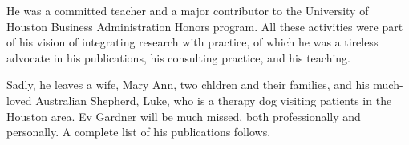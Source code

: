 \documentclass[11pt, a4paper]{article}
\begin{document}
He was a committed teacher and a major contributor to the University of Houston Business Administration Honors program. All these activities were part of his vision of integrating research with practice, of which he was a tireless advocate in his publications, his consulting practice, and his teaching.

Sadly, he leaves a wife, Mary Ann, two chldren and their families, and his much-loved Australian Shepherd, Luke, who is a therapy dog visiting patients in the Houston area. Ev Gardner will be much missed, both professionally and personally. A complete list of his publications follows.


\nocite{*}
\printbibliography[heading=subbibliography, title = {PhD}, type=thesis]
\printbibliography[heading=subbibliography, title = {Books}, type=book]
\printbibliography[heading=subbibliography, title = {Articles}, filter=other]
\end{document}
